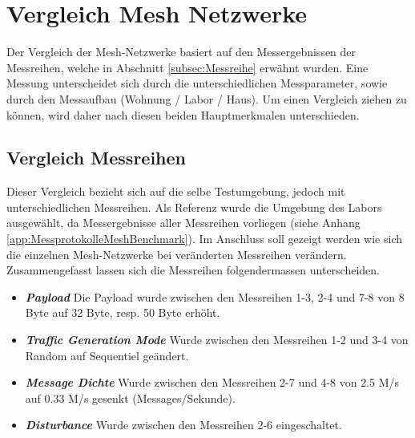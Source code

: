 \clearpage

\section{Vergleich Mesh Netzwerke}\label{sec:VergleichMeshNetzwerke}



Der Vergleich der Mesh-Netzwerke basiert auf den Messergebnissen der Messreihen, welche in Abschnitt \ref{subsec:Messreihe} erwähnt wurden. Eine Messung unterscheidet sich durch die unterschiedlichen Messparameter, sowie durch den Messaufbau (Wohnung / Labor / Haus). Um einen Vergleich ziehen zu können, wird daher nach diesen beiden Hauptmerkmalen unterschieden.

\subsection{Vergleich Messreihen}\label{subsec:VergleichMessreihen}

Dieser Vergleich bezieht sich auf die selbe Testumgebung, jedoch mit unterschiedlichen Messreihen. Als Referenz wurde die Umgebung des Labors ausgewählt, da Messergebnisse aller Messreihen vorliegen (siehe Anhang \ref{app:MessprotokolleMeshBenchmark}). Im Anschluss soll gezeigt werden wie sich die einzelnen Mesh-Netzwerke bei veränderten Messreihen verändern. \\

Zusammengefasst lassen sich die Messreihen folgendermassen unterscheiden. 

\begin{itemize}
	\item \textbf{\textit{Payload}} Die Payload wurde zwischen den Messreihen 1-3, 2-4 und 7-8 von 8 Byte auf 32 Byte, resp. 50 Byte erhöht.
	\item \textbf{\textit{Traffic Generation Mode}} Wurde zwischen den Messreihen 1-2 und 3-4 von Random auf Sequentiel geändert.
	\item \textbf{\textit{Message Dichte}} Wurde zwischen den Messreihen 2-7 und 4-8 von 2.5 M/s auf 0.33 M/s gesenkt (Messages/Sekunde).
	\item \textbf{\textit{Disturbance}} Wurde zwischen den Messreihen 2-6 eingeschaltet.
\end{itemize}

